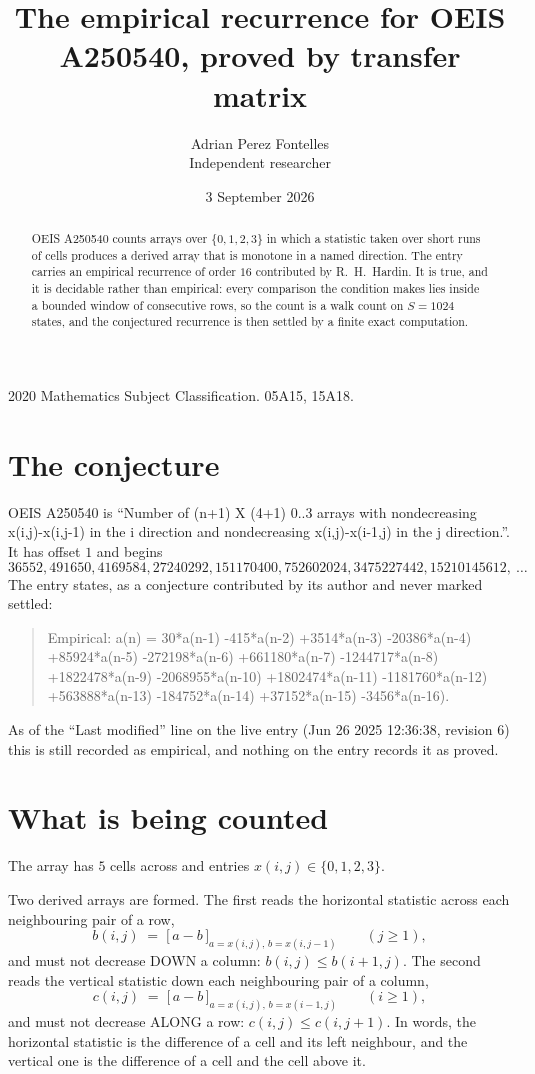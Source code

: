\documentclass[11pt,a4paper]{article}
\title{The empirical recurrence for OEIS A250540, proved by transfer matrix}
\author{Adrian Perez Fontelles\\ \small Independent researcher}
\date{3 September 2026}
\theoremstyle{plain}
\theoremstyle{definition}
\begin{document}
\maketitle

\begin{abstract}
OEIS A250540 counts arrays over $\{0,1,2,3\}$ in which a statistic taken over short runs
of cells produces a derived array that is monotone in a named direction. The entry carries an
empirical recurrence of order $16$ contributed by R.~H.~Hardin. It is true, and it is
decidable rather than empirical: every comparison the condition makes lies inside a bounded
window of consecutive rows, so the count is a walk count on $S=1024$ states, and the
conjectured recurrence is then settled by a finite exact computation.
\end{abstract}

\noindent\small 2020 Mathematics Subject Classification. 05A15, 15A18.\normalsize

\section{The conjecture}

OEIS A250540 is ``Number of (n+1) X (4+1) 0..3 arrays with nondecreasing x(i,j)-x(i,j-1) in the i direction and nondecreasing x(i,j)-x(i-1,j) in the j direction.''. It has offset $1$ and begins
\[
36552, 491650, 4169584, 27240292, 151170400, 752602024, 3475227442, 15210145612,\ \dots
\]
The entry states, as a conjecture contributed by its author and never marked settled:
\begin{quote}
Empirical: a(n) = 30*a(n-1) -415*a(n-2) +3514*a(n-3) -20386*a(n-4) +85924*a(n-5) -272198*a(n-6) +661180*a(n-7) -1244717*a(n-8) +1822478*a(n-9) -2068955*a(n-10) +1802474*a(n-11) -1181760*a(n-12) +563888*a(n-13) -184752*a(n-14) +37152*a(n-15) -3456*a(n-16).
\end{quote}
As of the ``Last modified'' line on the live entry (Jun 26 2025 12:36:38, revision 6) this is still
recorded as empirical, and nothing on the entry records it as proved.

\section{What is being counted}

The array has $5$ cells across and entries $x(i,j)\in\{0,1,2,3\}$.

Two derived arrays are formed. The first reads the horizontal statistic across each
neighbouring pair of a row,
\[
b(i,j)\;=\;\bigl[\,a-b\,\bigr]_{a=x(i,j),\,b=x(i,j-1)}\qquad (j\ge1),
\]
and must not decrease DOWN a column: $b(i,j)\le b(i{+}1,j)$. The second reads the vertical
statistic down each neighbouring pair of a column,
\[
c(i,j)\;=\;\bigl[\,a-b\,\bigr]_{a=x(i,j),\,b=x(i{-}1,j)}\qquad (i\ge1),
\]
and must not decrease ALONG a row: $c(i,j)\le c(i,j{+}1)$. In words, the horizontal statistic
is the difference of a cell and its left neighbour, and the vertical one is
the difference of a cell and the cell above it.
\end{document}
